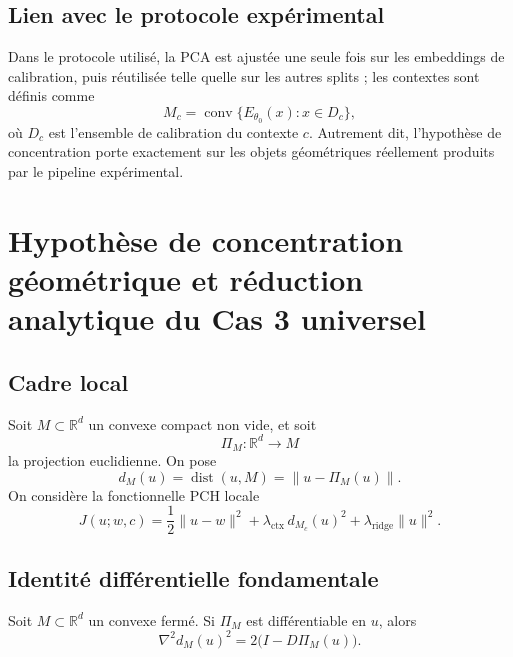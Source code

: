 \subsection{Lien avec le protocole expérimental}

Dans le protocole utilisé, la PCA est ajustée une seule fois sur les embeddings de calibration, puis réutilisée telle quelle sur les autres splits ; les contextes sont définis comme
\[
M_c=\operatorname{conv}\{E_{\theta_0}(x):x\in D_c\},
\]
où $D_c$ est l'ensemble de calibration du contexte $c$.  
Autrement dit, l'hypothèse de concentration porte exactement sur les objets géométriques réellement produits par le pipeline expérimental. 





\section{Hypothèse de concentration géométrique et réduction analytique du Cas 3 universel}

\subsection{Cadre local}

Soit \(M\subset \mathbb R^d\) un convexe compact non vide, et soit
\[
\Pi_M:\mathbb R^d\to M
\]
la projection euclidienne. On pose
\[
d_M(u)=\operatorname{dist}(u,M)=\|u-\Pi_M(u)\|.
\]
On considère la fonctionnelle PCH locale
\[
J(u;w,c)
=
\frac12\|u-w\|^2
+
\lambda_{\mathrm{ctx}}\, d_{M_c}(u)^2
+
\lambda_{\mathrm{ridge}}\|u\|^2.
\]

\subsection{Identité différentielle fondamentale}

\begin{lemma}
Soit \(M\subset\mathbb R^d\) un convexe fermé.  
Si \(\Pi_M\) est différentiable en \(u\), alors
\[
\nabla^2 d_M(u)^2
=
2\bigl(I-D\Pi_M(u)\bigr).
\]
\end{lemma}

